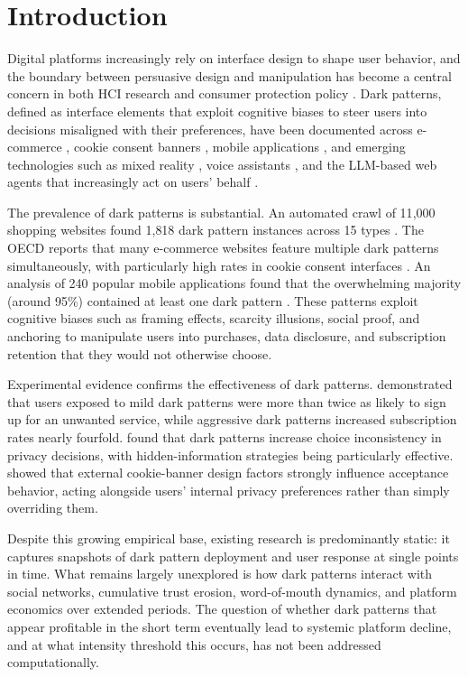 \documentclass[a4paper]{article}
\begin{document}
\section{Introduction}
Digital platforms increasingly rely on interface design to shape user behavior, and the boundary between persuasive design and manipulation has become a central concern in both HCI research and consumer protection policy \citep{gray2018,yi2025}. Dark patterns, defined as interface elements that exploit cognitive biases to steer users into decisions misaligned with their preferences, have been documented across e-commerce \citep{mathur2019}, cookie consent banners \citep{berens2024}, mobile applications \citep{gunawan2021}, and emerging technologies such as mixed reality \citep{meinhardt2025}, voice assistants \citep{deconca2023}, and the LLM-based web agents that increasingly act on users' behalf \citep{ersoy2026}.

The prevalence of dark patterns is substantial. An automated crawl of 11{,}000 shopping websites found 1{,}818 dark pattern instances across 15 types \citep{mathur2019}. The OECD reports that many e-commerce websites feature multiple dark patterns simultaneously, with particularly high rates in cookie consent interfaces \citep{oecd2022}. An analysis of 240 popular mobile applications found that the overwhelming majority (around 95\%) contained at least one dark pattern \citep{digeronimo2020}. These patterns exploit cognitive biases such as framing effects, scarcity illusions, social proof, and anchoring to manipulate users into purchases, data disclosure, and subscription retention that they would not otherwise choose.

Experimental evidence confirms the effectiveness of dark patterns. \citet{luguri2021} demonstrated that users exposed to mild dark patterns were more than twice as likely to sign up for an unwanted service, while aggressive dark patterns increased subscription rates nearly fourfold. \citet{bogliacino2026} found that dark patterns increase choice inconsistency in privacy decisions, with hidden-information strategies being particularly effective. \citet{papenmeier2025} showed that external cookie-banner design factors strongly influence acceptance behavior, acting alongside users' internal privacy preferences rather than simply overriding them.

Despite this growing empirical base, existing research is predominantly static: it captures snapshots of dark pattern deployment and user response at single points in time. What remains largely unexplored is how dark patterns interact with social networks, cumulative trust erosion, word-of-mouth dynamics, and platform economics over extended periods. The question of whether dark patterns that appear profitable in the short term eventually lead to systemic platform decline, and at what intensity threshold this occurs, has not been addressed computationally.
\end{document}
